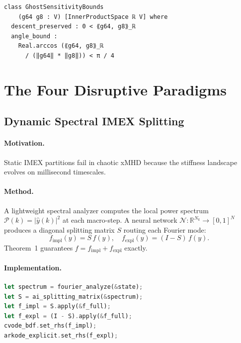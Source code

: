 \documentclass[11pt,twocolumn]{article}
\begin{document}
\begin{lstlisting}[language=Lean4,caption={Ghost gradient angle bound}]
class GhostSensitivityBounds
    (g64 g8 : V) [InnerProductSpace ℝ V] where
  descent_preserved : 0 < ⟪g64, g8⟫_ℝ
  angle_bound :
    Real.arccos (⟪g64, g8⟫_ℝ
      / (‖g64‖ * ‖g8‖)) < π / 4
\end{lstlisting}

\section{The Four Disruptive Paradigms}
\label{sec:paradigms}

\subsection{Dynamic Spectral IMEX Splitting}
\label{sec:imex}

\paragraph{Motivation.} Static IMEX partitions fail in chaotic xMHD
because the stiffness landscape evolves on millisecond timescales.

\paragraph{Method.} A lightweight spectral analyzer computes the local
power spectrum $\mathcal{P}(k) = |\hat{y}(k)|^2$ at each macro-step.
A neural network $\mathcal{N}: \mathbb{R}^{N_k} \to [0,1]^N$ produces
a diagonal splitting matrix $S$ routing each Fourier mode:
\begin{equation}
  f_{\mathrm{impl}}(y) = S\,f(y),\quad
  f_{\mathrm{expl}}(y) = (I-S)\,f(y).
  \label{eq:splitting}
\end{equation}
Theorem~1 guarantees $f = f_{\mathrm{impl}} + f_{\mathrm{expl}}$ exactly.

\paragraph{Implementation.}
\begin{lstlisting}[language=Rust,caption={Dynamic IMEX routing in Rust}]
let spectrum = fourier_analyze(&state);
let S = ai_splitting_matrix(&spectrum);
let f_impl = S.apply(&f_full);
let f_expl = (I - S).apply(&f_full);
cvode_bdf.set_rhs(f_impl);
arkode_explicit.set_rhs(f_expl);
\end{lstlisting}
\end{document}
